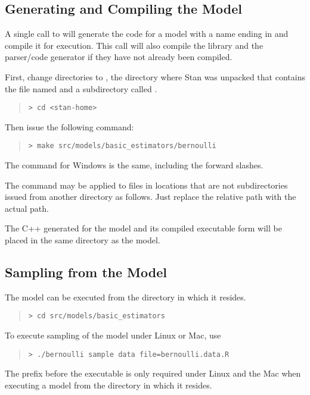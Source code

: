 \subsection{Generating and Compiling the Model}

A single call to  will generate the \Cpp code for a
model with a name ending in  and compile it for
execution.  This call will also compile the library 
and the parser/code generator  if they have not already
been compiled.

First, change directories to , the directory where
Stan was unpacked that contains the file named  and
a subdirectory called .
%
\begin{quote}
\begin{Verbatim}[fontshape=sl]
> cd <stan-home>
\end{Verbatim}
\end{quote}
%
Then issue the following command:
%
\begin{quote}
\begin{Verbatim}[fontshape=sl]
> make src/models/basic_estimators/bernoulli 
\end{Verbatim}
\end{quote}
%
The command for Windows is the same, including the forward slashes.

The  command may be applied to files in locations
that are not subdirectories issued from another directory as follows.
Just replace the relative path  with the
actual path.

The C++ generated for the model and its compiled executable
form will be placed in the same directory as the model.


\subsection{Sampling from the Model}

The model can be executed from the directory in which it resides.
%
\begin{quote}
\begin{Verbatim}[fontshape=sl]
> cd src/models/basic_estimators 
\end{Verbatim}
\end{quote}
%
To execute sampling of the model under Linux or Mac, use
%
\begin{quote}
\begin{Verbatim}[fontshape=sl]
> ./bernoulli sample data file=bernoulli.data.R
\end{Verbatim}
\end{quote}
%
The  prefix before the executable is only required under
Linux and the Mac when executing a model from the directory in which
it resides.

